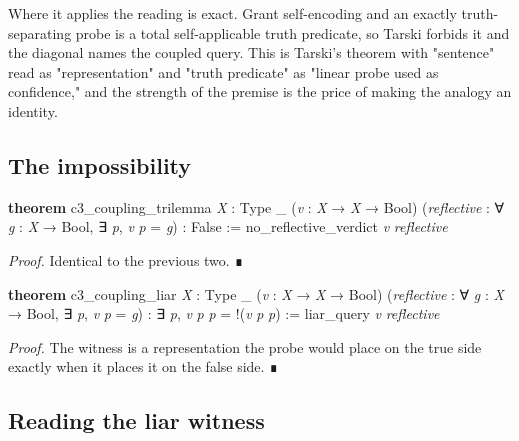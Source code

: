\documentclass{memoir}
\begin{document}
Where it applies the reading is exact. Grant self-encoding and an exactly
truth-separating probe is a total self-applicable truth predicate, so Tarski
forbids it and the diagonal names the coupled query. This is Tarski's theorem
with "sentence" read as "representation" and "truth predicate" as "linear probe
used as confidence," and the strength of the premise is the price of making the
analogy an identity.



\subsection{The impossibility}\label{Two--Schemas--of--Impossibility-005F-005F-005F--Machine--Checked--Limits--of--Trustworthy--Machine--Learning-005F-005F-005F--and--Why--They--Tighten--with--Capability----Three--Trilemmata-005F-005F-005F--One--Theorem----The--Coupling--Theorem----The--impossibility}

\begin{LeanVerbatim}
\textbf{theorem} c3_coupling_trilemma \textit{X} : Type _ (\textit{v} : \textit{X} → \textit{X} → Bool)
    (\textit{reflective} : ∀ \textit{g} : \textit{X} → Bool, ∃ \textit{p}, \textit{v} \textit{p} = \textit{g}) : False :=
  no_reflective_verdict \textit{v} \textit{reflective}

\end{LeanVerbatim}


\emph{Proof.} Identical to the previous two. ∎

\begin{LeanVerbatim}
\textbf{theorem} c3_coupling_liar \textit{X} : Type _ (\textit{v} : \textit{X} → \textit{X} → Bool)
    (\textit{reflective} : ∀ \textit{g} : \textit{X} → Bool, ∃ \textit{p}, \textit{v} \textit{p} = \textit{g}) :
    ∃ \textit{p}, \textit{v} \textit{p} \textit{p} = !(\textit{v} \textit{p} \textit{p}) :=
  liar_query \textit{v} \textit{reflective}

\end{LeanVerbatim}


\emph{Proof.} The witness is a representation the probe would place on the true side
exactly when it places it on the false side. ∎



\subsection{Reading the liar witness}\label{Two--Schemas--of--Impossibility-005F-005F-005F--Machine--Checked--Limits--of--Trustworthy--Machine--Learning-005F-005F-005F--and--Why--They--Tighten--with--Capability----Three--Trilemmata-005F-005F-005F--One--Theorem----The--Coupling--Theorem----Reading--the--liar--witness}
\end{document}
